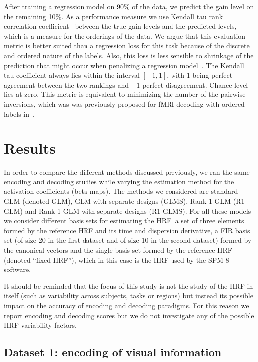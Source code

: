 After training a regression model on 90\% of the data, we predict the gain level on the
remaining 10\%. As a performance measure we use Kendall tau rank correlation
coefficient~\citep{kendall1938new} between the true gain levels and the
predicted levels, which is a measure for the orderings of the data.  We argue
that this evaluation metric is better suited than a regression loss for this
task because of the discrete and ordered nature of the labels. Also, this loss
is less sensible to shrinkage of the prediction that might occur when penalizing a
regression model~\citep{bekhti:hal-01032909}. The Kendall tau coefficient always lies within the interval
$[-1, 1]$, with $1$ being perfect agreement between the two rankings and $-1$
perfect disagreement. Chance level lies at zero. This metric is equivalent to minimizing the number of the pairwise inversions, which was was previously
proposed for fMRI decoding with ordered labels in~\citep{pedregosa:hal-00717990}.


\section{Results}

In order to compare the different methods discussed previously, we ran
the same encoding and decoding studies while varying the
estimation method for the activation coefficients (beta-maps). The
methods we considered are standard GLM (denoted \gls{GLM}), GLM with separate
designs (GLMS), Rank-1 GLM (R1-GLM) and Rank-1 GLM with separate designs
(R1-GLMS). For all these models we consider different basis sets for
estimating the HRF: a set of three elements formed by the reference HRF and
its time and dispersion derivative, a FIR basis set (of size 20 in the
first dataset and of size 10 in the second dataset) formed by the canonical vectors
and the single basis set formed by the reference HRF (denoted ``fixed HRF''), which
in this case is the HRF used by the SPM 8 software.

It should be reminded that the focus of this study is not the study of the HRF
in itself (such as variability across subjects, tasks or regions) but instead
its possible impact on the accuracy of encoding and decoding paradigms. For
this reason we report encoding and decoding scores but we do not investigate
any of the possible HRF variability factors.

\subsection{Dataset 1: encoding of visual information}

